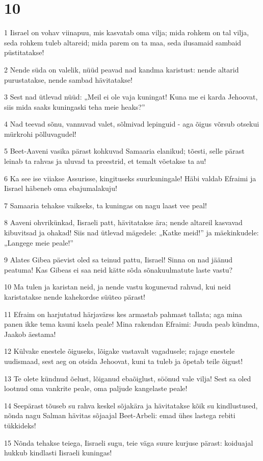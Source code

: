\chapter{10}

\par 1 Iisrael on vohav viinapuu, mis kasvatab oma vilja; mida rohkem on tal vilja, seda rohkem tuleb altareid; mida parem on ta maa, seda ilusamaid sambaid püstitatakse!
\par 2 Nende süda on valelik, nüüd peavad nad kandma karistust: nende altarid purustatakse, nende sambad hävitatakse!
\par 3 Sest nad ütlevad nüüd: „Meil ei ole vaja kuningat! Kuna me ei karda Jehoovat, siis mida saaks kuningaski teha meie heaks?”
\par 4 Nad teevad sõnu, vannuvad valet, sõlmivad lepinguid - aga õigus võrsub otsekui mürkrohi põlluvagudel!
\par 5 Beet-Aaveni vasika pärast kohkuvad Samaaria elanikud; tõesti, selle pärast leinab ta rahvas ja uluvad ta preestrid, et temalt võetakse ta au!
\par 6 Ka see ise viiakse Assurisse, kingituseks suurkuningale! Häbi valdab Efraimi ja Iisrael häbeneb oma ebajumalakuju!
\par 7 Samaaria tehakse vaikseks, ta kuningas on nagu laast vee peal!
\par 8 Aaveni ohvrikünkad, Iisraeli patt, hävitatakse ära; nende altareil kasvavad kibuvitsad ja ohakad! Siis nad ütlevad mägedele: „Katke meid!” ja mäekinkudele: „Langege meie peale!”
\par 9 Alates Gibea päevist oled sa teinud pattu, Iisrael! Sinna on nad jäänud peatuma! Kas Gibeas ei saa neid kätte sõda sõnakuulmatute laste vastu?
\par 10 Ma tulen ja karistan neid, ja nende vastu kogunevad rahvad, kui neid karistatakse nende kahekordse süüteo pärast!
\par 11 Efraim on harjutatud härjavärss kes armastab pahmast tallata; aga mina panen ikke tema kauni kaela peale! Mina rakendan Efraimi: Juuda peab kündma, Jaakob äestama!
\par 12 Külvake enestele õiguseks, lõigake vastavalt vagadusele; rajage enestele uudismaad, sest aeg on otsida Jehoovat, kuni ta tuleb ja õpetab teile õigust!
\par 13 Te olete kündnud õelust, lõiganud ebaõiglust, söönud vale vilja! Sest sa oled lootnud oma vankrite peale, oma paljude kangelaste peale!
\par 14 Seepärast tõuseb su rahva keskel sõjakära ja hävitatakse kõik su kindlustused, nõnda nagu Salman hävitas sõjaajal Beet-Arbeli: emad ühes lastega rebiti tükkideks!
\par 15 Nõnda tehakse teiega, Iisraeli sugu, teie väga suure kurjuse pärast: koiduajal hukkub kindlasti Iisraeli kuningas!

